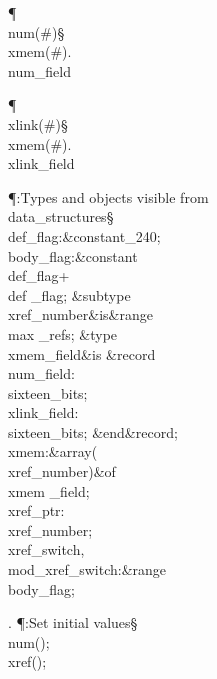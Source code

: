 \Y\P\4\D\\{num}\?\1(\?\#\?\2)\S\?\\{xmem}\?\1(\?\#\?\2).\?\\{num\_field}\?\6
\?\par
\P\4\D\\{xlink}\?\1(\?\#\?\2)\S\?\\{xmem}\?\1(\?\#\?\2).\?\\{xlink\_field}\?\6
\?\par
\Y\P\?\4:Types and objects visible from \\{data\_structures}\X\mathrel{+}\S%
\?\6
\\{def\_flag}\?:\?\&{constant}\8\?\K{}\_240;\6
\\{body\_flag}\?:\?\&{constant}\8\?\K\?\\{def\_flag}\?+\?\\{def%
\_flag};\7
\&{subtype}\8\\{xref\_number}\8\&{is}\8\8\&{range}\?\to\?\\{max%
\_refs};\6
\&{type}\8\\{xmem\_field}\8\&{is}\8\1\6
\&{record}\1\6
\\{num\_field}\?:\?\\{sixteen\_bits};\6
\\{xlink\_field}\?:\?\\{sixteen\_bits};\2\6
\2\&{end}\8\&{record};\7
\\{xmem}\?:\1\&{array}\8\1(\?\\{xref\_number}\?\2)\2\8\&{of}\?\8\\{xmem%
\_field};\6
\\{xref\_ptr}\?:\?\\{xref\_number}\?\K{};\6
\\{xref\_switch}\?,\?\\{mod\_xref\_switch}\?:\?\8\&{range}\?%
\to\?\\{body\_flag}\?\K{};\par
\fi

. \P\?:Set initial values\X\mathrel{+}\S\?\6
\\{num}\?\1(\?\2)\K{};\5
\\{xref}\?\1(\?\2)\K{};\par
\fi

